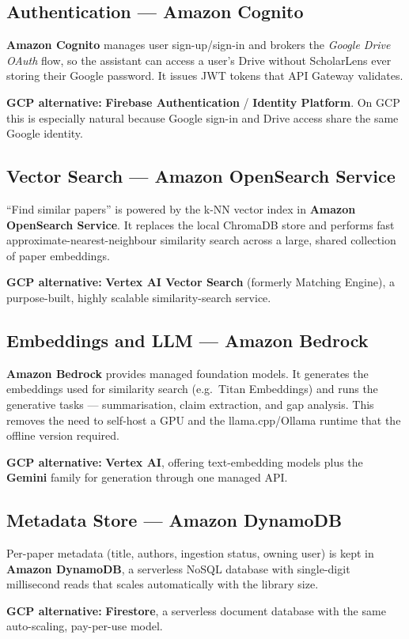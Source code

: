 \documentclass[12pt,a4paper]{article}
\begin{document}
\subsection{Authentication --- Amazon Cognito}
\textbf{Amazon Cognito} manages user sign-up/sign-in and brokers the
\emph{Google Drive OAuth} flow, so the assistant can access a user's Drive
without ScholarLens ever storing their Google password. It issues JWT tokens
that API Gateway validates.
\begin{gcpbox}
\textbf{GCP alternative:} \textbf{Firebase Authentication} / \textbf{Identity
Platform}. On GCP this is especially natural because Google sign-in and Drive
access share the same Google identity.
\end{gcpbox}

\subsection{Vector Search --- Amazon OpenSearch Service}
``Find similar papers'' is powered by the k-NN vector index in \textbf{Amazon
OpenSearch Service}. It replaces the local ChromaDB store and performs fast
approximate-nearest-neighbour similarity search across a large, shared
collection of paper embeddings.
\begin{gcpbox}
\textbf{GCP alternative:} \textbf{Vertex AI Vector Search} (formerly Matching
Engine), a purpose-built, highly scalable similarity-search service.
\end{gcpbox}

\subsection{Embeddings and LLM --- Amazon Bedrock}
\textbf{Amazon Bedrock} provides managed foundation models. It generates the
embeddings used for similarity search (e.g.\ Titan Embeddings) and runs the
generative tasks --- summarisation, claim extraction, and gap analysis. This
removes the need to self-host a GPU and the llama.cpp/Ollama runtime that the
offline version required.
\begin{gcpbox}
\textbf{GCP alternative:} \textbf{Vertex AI}, offering text-embedding models
plus the \textbf{Gemini} family for generation through one managed API.
\end{gcpbox}

\subsection{Metadata Store --- Amazon DynamoDB}
Per-paper metadata (title, authors, ingestion status, owning user) is kept in
\textbf{Amazon DynamoDB}, a serverless NoSQL database with single-digit
millisecond reads that scales automatically with the library size.
\begin{gcpbox}
\textbf{GCP alternative:} \textbf{Firestore}, a serverless document database
with the same auto-scaling, pay-per-use model.
\end{gcpbox}
\end{document}
